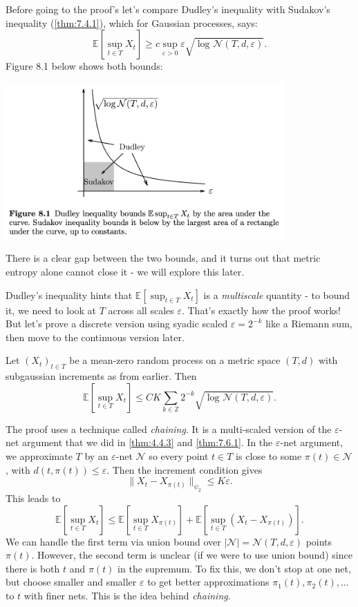 Before going to the proof's let's compare Dudley's inequality with Sudakov's inequality (\cref{thm:7.4.1}), 
which for Gaussian processes, says:
\[ \mathbb{E}\left[ \sup_{t \in T}X_t \right] \geq c \sup_{\varepsilon > 0}\varepsilon 
\sqrt{\log_{}{\mathcal{N}(T, d, \varepsilon)}}. \]
Figure 8.1 below shows both bounds: 
\begin{center}
	\includegraphics[width=0.8\textwidth]{Chapter 8/fig8-1.png}
\end{center}
There is a clear gap between the two bounds, and it turns out that metric entropy alone cannot close it - we 
will explore this later.

Dudley's inequality hints that $\mathbb{E}\left[ \sup_{t \in T}X_t \right]$ is a \textit{multiscale} quantity 
- to bound it, we need to look at $T$ across all scales $\varepsilon$. That's exactly how the proof works! But 
let's prove a discrete version using syadic scaled $\varepsilon = 2^{-k}$ like a Riemann sum, then move to the 
continuous version later.

\begin{theorem}
\label{thm:8.1.4}
Let $(X_t)_{t \in T}$ be a mean-zero random process on a metric space $(T, d)$ with subgaussian increments as 
from earlier. Then 
\[ \mathbb{E}\left[ \sup_{t \in T}X_t \right] \leq CK \sum_{k \in \mathbb{Z}}^{}2^{-k} 
\sqrt{\log_{}{\mathcal{N}(T, d, \varepsilon)}}. \]
\end{theorem}

The proof uses a technique called \textit{chaining}. It is a multi-scaled version of the $\varepsilon$-net 
argument that we did in \cref{thm:4.4.3} and \cref{thm:7.6.1}. In the $\varepsilon$-net argument, we approximate 
$T$ by an $\varepsilon$-net $\mathcal{N}$ so every point $t \in T$ is close to some $\pi(t) \in \mathcal{N}$, 
with $d(t, \pi(t)) \leq \varepsilon$. Then the increment condition gives 
\[ \lVert X_t - X_{\pi(t)} \rVert_{\psi_2} \leq K \varepsilon. \]
This leads to 
\[ \mathbb{E}\left[ \sup_{t \in T}X_t \right] \leq \mathbb{E}\left[ \sup_{t \in T}X_{\pi(t)} \right] 
+ \mathbb{E}\left[ \sup_{t \in T}(X_t - X_{\pi(t)}) \right]. \]
We can handle the first term via union bound over $|\mathcal{N}| = \mathcal{N}(T, d, \varepsilon)$ points 
$\pi(t)$. However, the second term is unclear (if we were to use union bound) since there is both $t$ and 
$\pi(t)$ in the supremum. To fix this, we don't stop at one net, but choose smaller and smaller $\varepsilon$ 
to get better approximations $\pi_1(t), \pi_2(t), \dots$ to $t$ with finer nets. This is the idea behind 
\textit{chaining}.

